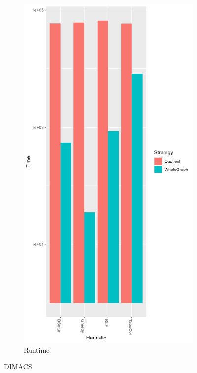 \documentclass[a4paper]{article}
\begin{document}
\begin{figure}
\begin{subfigure}{.5\paperwidth}
    \end{subfigure}%
    \begin{subfigure}{.5\paperwidth}
        \includegraphics[width=\columnwidth]{Tables/DIMACSTime.png}
      \caption{Runtime}
      \label{fig:dimacst}
    \end{subfigure}
\caption{DIMACS}
\label{fig:dimacs}
\end{figure}
\end{document}
